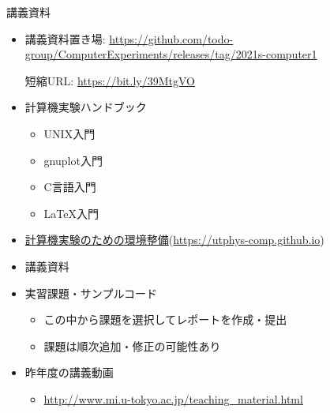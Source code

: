 \begin{frame}[t]{講義資料}
  \begin{itemize}
  \item 講義資料置き場: \href{https://github.com/todo-group/ComputerExperiments/releases/tag/2021s-computer1}{https://github.com/todo-group/ComputerExperiments/releases/tag/2021s-computer1}

    短縮URL: \href{https://bit.ly/39MtgVO}{https://bit.ly/39MtgVO}
    
  \item 計算機実験ハンドブック
    \begin{itemize}
    \item UNIX入門
    \item gnuplot入門
    \item C言語入門
    \item \LaTeX 入門
    \end{itemize}
  \item \href{https://utphys-comp.github.io}{計算機実験のための環境整備}({\small \href{https://utphys-comp.github.io}{https://utphys-comp.github.io}})
  \item 講義資料
  \item 実習課題・サンプルコード

    \begin{itemize}
    \item この中から課題を選択してレポートを作成・提出
    \item 課題は順次追加・修正の可能性あり
    \end{itemize}
  \item 昨年度の講義動画
    \begin{itemize}
      \item \href{http://www.mi.u-tokyo.ac.jp/teaching_material.html}{http://www.mi.u-tokyo.ac.jp/teaching\_material.html}
    \end{itemize}
  \end{itemize}
\end{frame}

